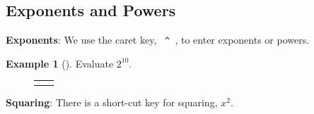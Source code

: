 \documentclass[10pt,]{book}
\newcommand{\terminology}[1]{\textbf{#1}}
\theoremstyle{plain}
\theoremstyle{definition}
\theoremstyle{definition}
\newtheorem{example}[theorem]{Example}
\theoremstyle{definition}
\numberwithin{equation}{part}
\newlength{\panelmax}
\begin{document}
\subsection[{Exponents and Powers}]{Exponents and Powers}\label{subsection-68}
\terminology{Exponents}:  We use the caret key, \lstinline? ^ ?, to enter exponents or powers.%
\begin{example}[]\label{example-100}
Evaluate \(2^{10}\).%
{%
\setlength{\panelmax}{0pt}
\newsavebox{\panelboxAIHp}
\newlength{\phAIHp}\setlength{\phAIHp}{\ht\panelboxAIHp+\dp\panelboxAIHp}
\settototalheight{\phAIHp}{\usebox{\panelboxAIHp}}
\setlength{\panelmax}{\maxof{\panelmax}{\phAIHp}}
\newsavebox{\panelboxAIIp}
\newlength{\phAIIp}\setlength{\phAIIp}{\ht\panelboxAIIp+\dp\panelboxAIIp}
\settototalheight{\phAIIp}{\usebox{\panelboxAIIp}}
\setlength{\panelmax}{\maxof{\panelmax}{\phAIIp}}
\leavevmode%
\setlength{\tabcolsep}{0.025\textwidth}
\begin{figure}
\begin{tabular}{@{}*{2}{c}@{}}
\begin{minipage}[c][\panelmax][t]{0.6\textwidth}\usebox{\panelboxAIHp}\end{minipage}&
\begin{minipage}[c][\panelmax][t]{0.35\textwidth}\usebox{\panelboxAIIp}\end{minipage}\end{tabular}
\end{figure}
}%
\end{example}
\par
\terminology{Squaring}: There is a short-cut key for squaring, \(\boxed{x^2}\).%
\end{document}
